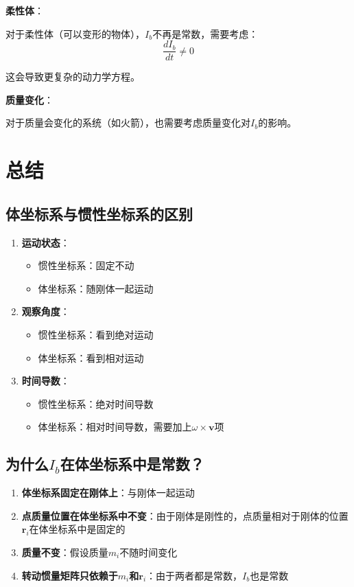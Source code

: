\documentclass[12pt,a4paper]{article}
\begin{document}
\textbf{柔性体}：

对于柔性体（可以变形的物体），$I_b$不再是常数，需要考虑：
\begin{equation}
\frac{dI_b}{dt} \neq 0
\end{equation}

这会导致更复杂的动力学方程。

\textbf{质量变化}：

对于质量会变化的系统（如火箭），也需要考虑质量变化对$I_b$的影响。

\section{总结}

\subsection{体坐标系与惯性坐标系的区别}

\begin{enumerate}
\item \textbf{运动状态}：
\begin{itemize}
\item 惯性坐标系：固定不动
\item 体坐标系：随刚体一起运动
\end{itemize}

\item \textbf{观察角度}：
\begin{itemize}
\item 惯性坐标系：看到绝对运动
\item 体坐标系：看到相对运动
\end{itemize}

\item \textbf{时间导数}：
\begin{itemize}
\item 惯性坐标系：绝对时间导数
\item 体坐标系：相对时间导数，需要加上$\omega \times \bm{v}$项
\end{itemize}
\end{enumerate}

\subsection{为什么$I_b$在体坐标系中是常数？}

\begin{enumerate}
\item \textbf{体坐标系固定在刚体上}：与刚体一起运动

\item \textbf{点质量位置在体坐标系中不变}：由于刚体是刚性的，点质量相对于刚体的位置$\bm{r}_i$在体坐标系中是固定的

\item \textbf{质量不变}：假设质量$m_i$不随时间变化

\item \textbf{转动惯量矩阵只依赖于$m_i$和$\bm{r}_i$}：由于两者都是常数，$I_b$也是常数
\end{enumerate}
\end{document}
